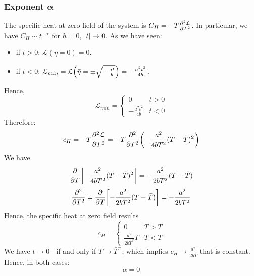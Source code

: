 \documentclass[../main/main.tex]{subfiles}
\begin{document}
\subsubsection{Exponent \( \pmb{\alpha}  \)}
The specific heat at zero field of the system is \(   C_H = - T \pdv[2]{\mathcal{L}}{T} \).
In particular, we have \( C _H \sim t^{-\alpha } \) for  \( h=0 \), \( \abs{t}  \rightarrow 0 \).
As we have seen:

\begin{itemize}
\item if \( t>0 \):  \( \mathcal{L} (\bar{\eta }=0 )= 0 \).
\item if \( t < 0 \): \( \mathcal{L}_{min} = \mathcal{L} \qty(\bar{\eta } = \pm \sqrt{- \frac{at}{b}}  ) = - \frac{a^2t^2}{4b}  \).
\end{itemize}
Hence,
\begin{equation*}
  \mathcal{L}_{min} =
    \begin{cases}
     0 & t > 0\\
     - \frac{a^2 t^2}{4b} & t < 0
    \end{cases}
\end{equation*}
Therefore:
\begin{equation*}
  c_H = - T \pdv[2]{\mathcal{L}}{T} = - T \pdv[2]{}{T} \qty(- \frac{a^2}{4b \bar{T}^2 }(T- \bar{T} )^2)
\end{equation*}
We have
\begin{equation*}
  \pdv{}{T} (\dots) \qty[- \frac{a^2}{4b \bar{T}^2 }(T- \bar{T} )^2 ] = - \frac{a^2}{2 b \bar{T}^2 } (T- \bar{T} )
\end{equation*}
\begin{equation*}
  \pdv[2]{}{T} = \pdv{}{T} \qty[ - \frac{a^2}{2 b \bar{T}^2 } (T- \bar{T} )]   = - \frac{a^2}{2 b \bar{T}^2 }
\end{equation*}
Hence, the specific heat at zero field results
\begin{equation*}
c_H =
  \begin{cases}
   0 & T > \bar{T} \\
   \frac{a^2}{2 b \bar{T}^2 } T & T < \bar{T}
  \end{cases}
\end{equation*}
We have \( t \rightarrow 0^- \) if and only if \( T \rightarrow \bar{T}^-  \), which implies \( c_H \rightarrow \frac{a^2}{2b \bar{T} } \) that is constant. Hence, in both cases:
\begin{equation*}
  \alpha =0
\end{equation*}
\end{document}
